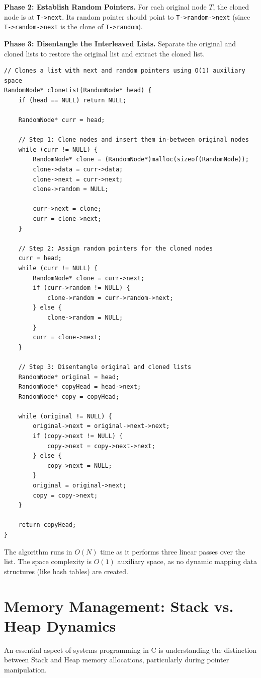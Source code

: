 \documentclass[10pt,journal,compsoc]{IEEEtran}
\begin{document}
\textbf{Phase 2: Establish Random Pointers.} For each original node $T$, the cloned node is at \texttt{T->next}. Its random pointer should point to \texttt{T->random->next} (since \texttt{T->random->next} is the clone of \texttt{T->random}).

\textbf{Phase 3: Disentangle the Interleaved Lists.} Separate the original and cloned lists to restore the original list and extract the cloned list.

\begin{verbatim}
// Clones a list with next and random pointers using O(1) auxiliary space
RandomNode* cloneList(RandomNode* head) {
    if (head == NULL) return NULL;
    
    RandomNode* curr = head;
    
    // Step 1: Clone nodes and insert them in-between original nodes
    while (curr != NULL) {
        RandomNode* clone = (RandomNode*)malloc(sizeof(RandomNode));
        clone->data = curr->data;
        clone->next = curr->next;
        clone->random = NULL;
        
        curr->next = clone;
        curr = clone->next;
    }
    
    // Step 2: Assign random pointers for the cloned nodes
    curr = head;
    while (curr != NULL) {
        RandomNode* clone = curr->next;
        if (curr->random != NULL) {
            clone->random = curr->random->next;
        } else {
            clone->random = NULL;
        }
        curr = clone->next;
    }
    
    // Step 3: Disentangle original and cloned lists
    RandomNode* original = head;
    RandomNode* copyHead = head->next;
    RandomNode* copy = copyHead;
    
    while (original != NULL) {
        original->next = original->next->next;
        if (copy->next != NULL) {
            copy->next = copy->next->next;
        } else {
            copy->next = NULL;
        }
        original = original->next;
        copy = copy->next;
    }
    
    return copyHead;
}
\end{verbatim}

The algorithm runs in $O(N)$ time as it performs three linear passes over the list. The space complexity is $O(1)$ auxiliary space, as no dynamic mapping data structures (like hash tables) are created.

\section{Memory Management: Stack vs. Heap Dynamics}
An essential aspect of systems programming in C is understanding the distinction between Stack and Heap memory allocations, particularly during pointer manipulation.
\end{document}
